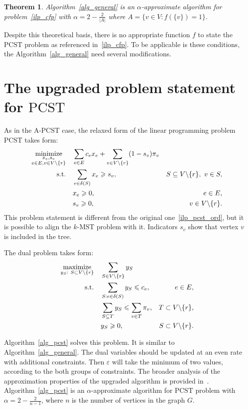 \documentclass[12pt]{article}
\newtheorem{theorem}{Theorem}
\begin{document}
\begin{theorem}
  Algorithm~\ref{alg_general} is an $\alpha$-approximate algorithm for problem~\eqref{ilp_cfp} with $\alpha = 2 - \frac{2}{|A|}$ where $A=\{v\in V: f(\{v\})=1\}$.
  \label{theorem2}
\end{theorem}
Despite this theoretical basis, there is no appropriate function $f$ to state the $\text{PCST}$ problem as referenced in~\eqref{ilp_cfp}. To be applicable is these conditions, the Algorithm~\ref{alg_general} need several modifications.

\section{The upgraded problem statement for $\text{PCST}$}

As in the $\text{A}$-$\text{PCST}$ case, the relaxed form of the linear programming problem $\text{PCST}$ takes form:
\begin{align}
\underset{\substack{x_e,s_v \\ e\in E, v\in V\backslash \{r\}}}{\text{minimize}}\quad & \sum\limits_{e\in E}c_ex_e + \sum\limits_{v\in V\backslash\{r\}}(1-s_v)\pi_v \nonumber\\
\text{s.t.\quad} & \sum\limits_{e\in\delta(S)}x_e\geqslant s_v, & S\subseteq V\backslash \{r\},~v\in S,\label{rlp_pcst_inord}\\
& x_e\geqslant 0, & e\in E,\nonumber\\
& s_v\geqslant 0, & v\in V\backslash \{r\}.\nonumber
\end{align}
This problem statement is different from the original one~\eqref{ilp_pcst_ord}, but it is possible to align the $k\text{-MST}$ problem with it. Indicators $s_v$ show that vertex $v$ is included in the tree.

The dual problem takes form:
\begin{align}
\underset{\substack{y_S:~S\subset V\backslash\{r\}}}{\text{maximize}}\quad & \sum\limits_{S\in V\backslash\{r\}}y_S \nonumber\\
\text{s.t.\quad} & \sum\limits_{S:e\in\delta(S)}y_S\leqslant c_e , & e\in E,\label{rd_pcst_inord}\\
& \sum\limits_{S\subseteq T}y_S\leqslant \sum\limits_{v\in T}\pi_v, & T\subset V\backslash\{r\},\nonumber\\
& y_S\geqslant 0, & S\subset V\backslash\{r\}.\nonumber
\end{align}

Algorithm~\ref{alg_pcst} solves this problem. It is similar to Algorithm~\ref{alg_general}. The dual variables should be updated at an even rate with additional constraints. Then $\varepsilon$ will take the minimum of two values, according to the both groups of constraints.
The broader analysis of the approximation properties of the upgraded algorithm is provided in~\cite{goemans1995general}. Algorithm~\ref{alg_pcst} is an $\alpha$-approximate algorithm for $\text{PCST}$ problem with $\alpha = 2 - \frac{2}{n-1}$, where $n$ is the number of vertices in the graph $G$.
\end{document}
